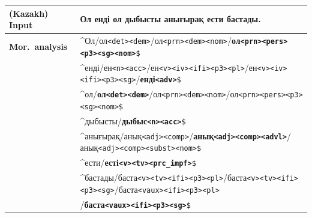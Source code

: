 \documentclass[a4paper,11pt]{article}
\newcommand{\tag}[1]{{\small{\texttt{#1}}}}
\begin{document}
\begin{table}[htbp]
\centering
\begin{tabular}{ll}
\toprule
{\bf (Kazakh) Input} & Ол енді ол дыбысты анығырақ ести бастады. \\
\midrule
{\bf Mor.\ analysis} & \^{}Ол/ол\tag{<det>}\tag{<dem>}/ол\tag{<prn>}\tag{<dem>}\tag{<nom>}/\textbf{ол\tag{<prn>}\tag{<pers>}\tag{<p3>}\tag{<sg>}\tag{<nom>}}\tag{\$} \\
                     & \^{}енді/ен\tag{<n>}\tag{<acc>}/ен\tag{<v>}\tag{<iv>}\tag{<ifi>}\tag{<p3>}\tag{<pl>}/ен\tag{<v>}\tag{<iv>}\tag{<ifi>}\tag{<p3>}\tag{<sg>}/\textbf{енді\tag{<adv>}}\tag{\$}  \\
							& \^{}ол/\textbf{ол\tag{<det>}\tag{<dem>}}/ол\tag{<prn>}\tag{<dem>}\tag{<nom>}/ол\tag{<prn>}\tag{<pers>}\tag{<p3>}\tag{<sg>}\tag{<nom>}\tag{\$} \\
                     & \^{}дыбысты/\textbf{дыбыс\tag{<n>}\tag{<acc>}}\tag{\$} \\
							& \^{}анығырақ/анық\tag{<adj>}\tag{<comp>}/\textbf{анық\tag{<adj>}\tag{<comp>}\tag{<advl>}}/анық\tag{<adj>}\tag{<comp>}\tag{<subst>}\tag{<nom>}\tag{\$} \\
                     & \^{}ести/\textbf{есті\tag{<v>}\tag{<tv>}\tag{<prc\_impf>}}\tag{\$}  \\
                     & \^{}бастады/баста\tag{<v>}\tag{<tv>}\tag{<ifi>}\tag{<p3>}\tag{<pl>}/баста\tag{<v>}\tag{<tv>}\tag{<ifi>}\tag{<p3>}\tag{<sg>}/баста\tag{<vaux>}\tag{<ifi>}\tag{<p3>}\tag{<pl>} \\
                     & \hspace{2em}/\textbf{баста\tag{<vaux>}\tag{<ifi>}\tag{<p3>}\tag{<sg>}}\tag{\$}  \\

\end{tabular}
\end{table}
\end{document}
